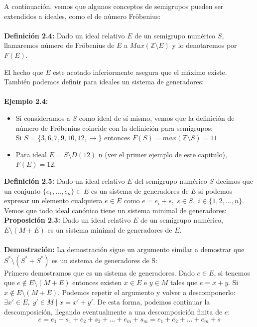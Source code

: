 \documentclass[11pt,spanish]{book}
\begin{document}
A continuación, vemos que algunos conceptos de semigrupos pueden ser extendidos a ideales, como el de número Fröbenius:\\
\\ \textbf{Definición 2.4: } Dado un ideal relativo $E$ de un semigrupo numérico $S$, llamaremos número de Fröbenius de $E$ a $Max(\mathbb{Z}\setminus E)$ y lo denotaremos por $F(E)$.

El hecho que $E$ este acotado inferiormente asegura que el máximo existe. \\

También podemos definir para ideales un sistema de generadores:\\
\\ \textbf{Ejemplo 2.4:}
\begin{itemize}
    \item Si consideramos a $S$ como ideal de sí mismo, vemos que la definición de número de Fröbenius coincide con la definición para semigrupos:\\ Si $S = \{3,6,7,9,10,12,\rightarrow\}$ entonces $F(S)=max(\mathbb{Z}\setminus S) = 11$
    \item Para ideal $E=S\setminus D(12)$ n (ver el primer ejemplo de este capitulo), $F(E)=12$.
\end{itemize}
\textbf{Definición 2.5: } Dado un ideal relativo $E$ del semigrupo numérico $S$ decimos que un conjunto $\{e_{1},\ldots,e_{n}\}\subset E$ es un sistema de generadores de $E$ si podemos expresar un elemento cualquiera $e\in E$ como $e=e_{i}+s,\;s\in S,\; i\in\{1,2,\ldots,n\}$.\\

Vemos que todo ideal canónico tiene un sistema minimal de generadores:
\\ \textbf{Proposición 2.3:} Dado un ideal relativo $E$ de un semigrupo numérico, $E\setminus(M+E)$ es un sistema minimal de generadores de $E$.\\
\\ \textbf{Demostración:} La demostración sigue un argumento similar a demostrar que $S^{*}\setminus (S^{*}+S^{*})$ es un sistema de generadores de S:\\

Primero demostramos que es un sistema de generadores. Dado $e\in E$, si tenemos que $e\notin E\setminus(M+E)$ entonces existen $x\in E$ e $y\in M$ tales que $e=x+y$. Si $x\notin E\setminus(M+E)$. Podemos repetir el argumento y volver a descomponerlo: $\exists x'\in E,\;y'\in M\; |\; x = x' + y'$. De esta forma, podemos continuar la descomposición, llegando eventualmente a una descomposición finita de $e$: 
$$e=e_{1}+s_{1}+e_{2}+s_{2}+\ldots+e_{m}+s_{m} = e_{1}+e_{2}+\ldots +e_{m}+s$$\\
\end{document}
